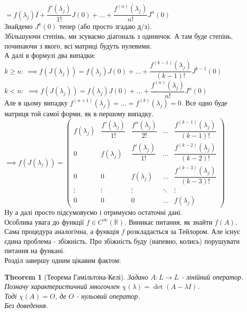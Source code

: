 \documentclass[a4paper, 10pt]{article}
\theoremstyle{theoremdd}
\newtheorem{theorem}{Theorem}[subsection]
\begin{document}
$\boxed{=} f(\lambda_j)I + \dfrac{f'(\lambda_j)}{1!}J(0) + \dots + \dfrac{f^{(n)}(\lambda_j)}{n!}J^n(0)$\\
Знайдемо $J^k(0)$ тепер (або просто згадаю д/з).\\
Збільшуючи степінь, ми зсуваємо діагональ з одиничок. А там буде степінь, починаючи з якого, всі матриці будуть нулевими.\\
А далі в формулі два випадки:\\
$k \geq n$:
$\implies f(J(\lambda_j)) = f(\lambda_j)J(0) + \dots + \dfrac{f^{(k-1)}(\lambda_j)}{(k-1)!}J^{k-1}(0)$\\
$k < n:$
$\implies f(J(\lambda_j)) = f(\lambda_j)J(0) + \dots + \dfrac{f^{(n)}(\lambda_j)}{n!}J^{n}(0)$\\
Але в цьому випадку $f^{(n+1)}(\lambda_j) = \dots = f^{(k)}(\lambda_j) = 0$. Все одно буде матриця той самої форми, як в першому випадку.\\
$\implies f(J(\lambda_j)) = \begin{pmatrix}
 f(\lambda_j) & \dfrac{f'(\lambda_j)}{1!} & \dfrac{f''(\lambda_j)}{2!} & \dots & \dfrac{f^{(k-1)}(\lambda_j)}{(k-1)!} \\
 0 & f(\lambda_j) & \dfrac{f'(\lambda_j)}{1!} & \dots & \dfrac{f^{(k-2)}(\lambda_j)}{(k-2)!} \\
 0 & 0 & f(\lambda_j) & \dots & \dfrac{f^{(k-3)}(\lambda_j)}{(k-3)!} \\
 \vdots & \vdots & \vdots & \ddots & \vdots \\
 0 & 0 & 0 & \dots & f(\lambda_j) 
\end{pmatrix}$\\
Ну а далі просто підсумовуємо і отримуємо остаточні дані.
\bigskip \\

Особлива увага до функції $f \in C^{\infty}(\mathbb{R})$. Виникає питання, як знайти $f(A)$. Сама процедура аналогічна, а функція $f$ розкладається за Тейлором. Але існує єдина проблема - збіжність. Про збіжність буду (напевно, колись) порушувати питання на функані.
\bigskip \\

Розділ завершу одним цікавим фактом:
\begin{theorem}[Теорема Гамільтона-Келі]
Задано $A: L \to L$ - лінійний оператор. Позначу характеристичний многочлен $\chi (\lambda) = \det (A-\lambda I)$.\\
Тоді $\chi (A) = O$, де $O$ - нульовий оператор.\\
\textit{Без доведення.}
\end{theorem}
\newpage
\end{document}
